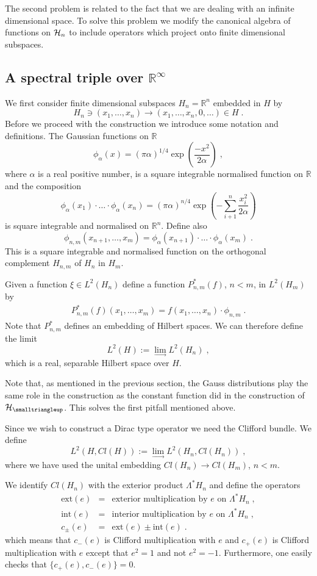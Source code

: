 \documentclass[12pt]{article}
\newcommand{\ba}{\begin{eqnarray}}
\newcommand{\ea}{\end{eqnarray}}
\newcommand{\nn}{\nonumber}
\def\a{\alpha}
\def\p{\pi}
\def\ch{{\cal H}}
\begin{document}
The second problem is related to the fact that we are dealing with an infinite dimensional space. 
To solve this problem we modify the canonical algebra of functions on $\ch_n$ to include operators which project onto finite dimensional subspaces.



\subsection{A spectral triple over $\mathbb{R}^\infty$}
\label{gausssection}

We first consider finite dimensional subspaces $H_n=\mathbb{R}^n$ embedded in $H$ by
\[
H_n\ni(x_1,\ldots,x_n)\rightarrow (x_1,\ldots,x_n,0,\ldots)\in H\;.
\]
Before we proceed with the construction we introduce some notation and definitions.
The Gaussian functions on $\mathbb{R}$
\[
\phi_\a(x) =(\p\a)^{1/4} \exp\left(\frac{-x^2}{2\a}\right)\;,
\]
where $\a$ is a real positive number, is a square integrable normalised function on $\mathbb{R}$ and the composition 
\[
\phi_\a(x_1)\cdot\ldots\cdot\phi_\a(x_n) =(\p\a)^{n/4} \exp\left(-\sum_{i+1}^n \frac{x_i^2}{2\a}\right)
\]
is square integrable and normalised on $\mathbb{R}^n$. Define also
\[
\phi_{n,m} (x_{n+1},\ldots,x_m)=\phi_\a(x_{n+1})\cdot\ldots\cdot \phi_\a(x_m)\;.
\]
This is a square integrable and normalised function on the orthogonal complement $H_{n,m}$ of $H_n$ in $H_m$.

Given a function $\xi\in L^2(H_n)$ define a function $P^\ast_{n,m}(f)$, $n<m$, in $L^2(H_m)$ by
\ba 
P^\ast_{n,m}(f)(x_1,\ldots,x_m)= f(x_1,\ldots,x_n)\cdot\phi_{n,m}\;.
\label{Hem}
\ea
Note that $P^\ast_{n,m}$ defines an embedding of Hilbert spaces. We can therefore define the limit
\[
L^2(H):=\lim_{\rightarrow}L^2(H_n)\;,
\]
which is a real, separable Hilbert space over $H$.

Note that, as mentioned in the previous section, the Gauss distributions play the same role in the construction as the constant function did in the construction of $\ch_{\smalltriangleup}$. This solves the first pitfall mentioned above.


Since we wish to construct a Dirac type operator we need the Clifford bundle. We define
\[
L^2(H,Cl(H)):=\lim_{\rightarrow}L^2(H_n,Cl(H_n))\;,
\]
where we have used the unital embedding $Cl(H_n)\rightarrow Cl(H_m)$, $n<m$.

We identify $Cl(H_n)$ with the exterior product $\Lambda^\ast H_n$ and define the operators
\ba
\mbox{ext}(e)&=& \mbox{exterior multiplication by $e$ on $\Lambda^\ast H_n$}\;,\nn\\
\mbox{int}(e)&=& \mbox{interior multiplication by $e$ on $\Lambda^\ast H_n$}\;,\nn\\
c_\pm (e)&=&  \mbox{ext}(e)\pm \mbox{int}(e)\;.\nn
\ea
which means that $c_-(e)$ is Clifford multiplication with $e$ and $c_+(e)$ is Clifford multiplication with $e$ except that $e^2=1$ and not $e^2=-1$. Furthermore, one easily checks that $\{c_+(e),c_-(e)\}=0$.
 
\end{document}
